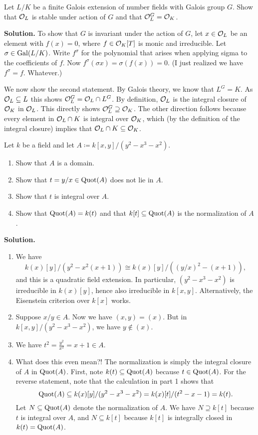 \documentclass[a4paper,11pt]{article}
\begin{document}
Let $L/K$ be a finite Galois extension of number fields with Galois group $G$. 
Show that $\mathcal{O}_L$ is stable under action of $G$ and that $\mathcal{O}_L^G = \mathcal{O}_K$. 

\textbf{Solution.} To show that $G$ is invariant under the action of $G$, let
$x \in \mathcal{O}_L$ be an element with $f(x) = 0$, where $f \in \mathcal{O}_K[T]$ is 
monic and irreducible. Let $\sigma \in \operatorname{Gal}(L/K)$. Write $f^\sigma$ for the 
polynomial that arises when applying sigma to the coefficients of 
$f$. Now $f^\sigma (\sigma x) = \sigma(f(x)) = 0.$ (I just realized we have
$f^\sigma = f$. Whatever.)

We now show the second statement. By Galois theory, we know that 
$L^G = K$. As $\mathcal{O}_L \subseteq L$ this shows 
$\mathcal{O}_L^G = \mathcal{O}_L \cap L^G$. By definition, $\mathcal{O}_L$ is the integral closure of
$\mathcal{O}_K$ in $\mathcal{O}_L$. This directly shows $\mathcal{O}_L^G \supseteq \mathcal{O}_K$. The other 
direction follows because every element in $\mathcal{O}_L \cap K$ is integral over 
$\mathcal{O}_K$, which (by the definition of the integral closure) implies that
$\mathcal{O}_L \cap K \subseteq \mathcal{O}_K$. 

Let $k$ be a field and let $A \coloneqq k[x,y]/(y^2-x^3-x^2)$. 
\begin{enumerate}
    \item Show that $A$ is a domain.
    \item Show that $t = y/x \in \mathrm{Quot}(A)$ does not lie in $A$.
    \item Show that $t$ is integral over $A$.
    \item Show that $\mathrm{Quot}(A) = k(t)$ and that $k[t] \subseteq \mathrm{Quot}(A)$ is 
        the normalization of $A$. 
\end{enumerate}
\textbf{Solution.}
\begin{enumerate}
    \item We have 
        $$k(x)[y]/(y^2 - x^2(x+1)) \cong k(x)[y]/((y/x)^2 - (x+1)),$$
        and this is a quadratic field extension. In particular, $(y^2 - x^3 - x^2)$
        is irreducible in $k(x)[y]$, hence also irreducible in $k[x,y]$. 
        Alternatively, the Eisenstein criterion over $k[x]$ works.
    \item Suppose $x/y \in A$. Now we have $(x,y) = (x)$. But in $k[x,y]/(y^2 -
        x^3 -x^2)$, we have $y \not \in (x)$.  
    \item We have $t^2 = \frac{y^2}{x^2} = x + 1 \in A$.
    \item What does this even mean?! The normalization is simply the integral closure
        of $A$ in $\mathrm{Quot}(A)$. First, note $k(t) \subseteq \mathrm{Quot}(A)$ because 
        $t \in \mathrm{Quot}(A)$. For the reverse statement, note that the calculation 
        in part 1 shows that 
        $$\mathrm{Quot}(A) \subseteq k(x)[y]/(y^2 - x^3- x^2) = k(x)[t]/(t^2 - x -1)=k(t).$$
        Let $N \subseteq \mathrm{Quot}(A)$ denote the normalization of $A$. We have 
        $N \supseteq k[t]$ because $t$ is integral over $A$, and $N \subseteq k[t]$
        because $k[t]$ is integrally closed in $k(t) = \mathrm{Quot}(A)$. 
\end{enumerate}

\contactend
\end{document}

